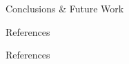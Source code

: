 \documentclass[22pt]{beamer}
\begin{document}
\begin{frame}[fragile]
\begin{textblock}{5}
\begin{block}{Conclusions \& Future Work}
\end{block}


\begin{block}{References}

References

\end{block}


% 

\end{textblock}
\end{frame}
\end{document}

